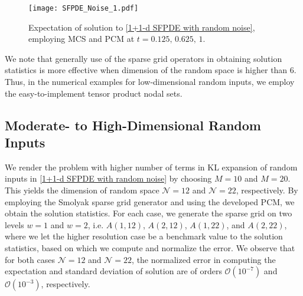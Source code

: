 %
%
\begin{figure}[t]
	\centering
	\texttt{[image: SFPDE\_Noise\_1.pdf]}
	\caption{Expectation of solution to \eqref{1+1-d SFPDE with random noise}, employing MCS and PCM at $t=0.125, \, 0.625, \, 1$.}
	\label{Fig: MCM PCM SFPDE-2}
\end{figure}
%
%

\begin{rem}
%	
We note that generally use of the sparse grid operators in obtaining solution statistics is more effective when dimension of the random space is higher than 6. Thus, in the numerical examples for low-dimensional random inputs, we employ the easy-to-implement tensor product nodal sets. 
%	
\end{rem}




%
\subsection{Moderate- to High-Dimensional Random Inputs}
%
We render the problem with higher number of terms in KL expansion of random inputs in \eqref{1+1-d SFPDE with random noise} by choosing $M=10$ and $M=20$. This yields the dimension of random space $\mathcal{N} = 12$ and $\mathcal{N} = 22$, respectively. By employing the Smolyak sparse grid generator and using the developed PCM, we obtain the solution statistics. For each case, we generate the sparse grid on two levels $w=1$ and $w=2$, i.e. $A(1,12)$, $A(2,12)$, $A(1,22)$, and $A(2,22)$, where we let the higher resolution case be a benchmark value to the solution statistics, based on which we compute and normalize the error. We observe that for both cases $\mathcal{N} = 12$ and $\mathcal{N} = 22$, the normalized error in computing the expectation and standard deviation of solution are of orders $\mathcal{O}(10^{-7})$ and $\mathcal{O}(10^{-3})$, respectively. 


